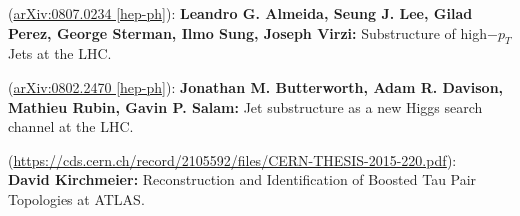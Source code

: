 \begin{thebibliography}{20}	
        (\href{https://arxiv.org/abs/0807.0234}{arXiv:0807.0234 [hep-ph]}):
        {\bf Leandro G. Almeida, Seung J. Lee, Gilad Perez, George Sterman, Ilmo Sung, Joseph Virzi:}
        Substructure of high$-p_T$ Jets at the LHC.
        
        (\href{https://arxiv.org/abs/0802.2470}{arXiv:0802.2470 [hep-ph]}):
        {\bf Jonathan M. Butterworth, Adam R. Davison, Mathieu Rubin, Gavin P. Salam:}
        Jet substructure as a new Higgs search channel at the LHC.

        (\url{https://cds.cern.ch/record/2105592/files/CERN-THESIS-2015-220.pdf}):\\
        {\bf David Kirchmeier:}
        Reconstruction and Identification of Boosted Tau Pair Topologies at ATLAS.

\end{thebibliography}
